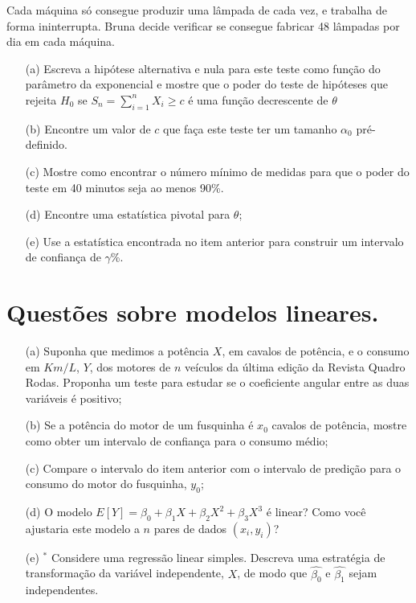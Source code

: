 \documentclass[a4paper,12pt, notitlepage]{report}
\begin{document}
Cada máquina só consegue produzir uma lâmpada de cada vez, e trabalha de forma ininterrupta.
Bruna decide verificar se consegue fabricar 48 lâmpadas por dia em cada máquina.

\begin{itemize}
 \item[(a)] Escreva a hipótese alternativa e nula para este teste como função do parâmetro da exponencial e mostre que o poder do teste de hipóteses que rejeita $H_0$ se $S_n = \sum_{i=1}^nX_i \ge c$ é uma função decrescente de $\theta$
 \item[(b)] Encontre um valor de $c$ que faça este teste ter um tamanho $\alpha_0$ pré-definido.
 \item[(c)] Mostre como encontrar o número mínimo de medidas para que o poder do teste em 40 minutos seja ao menos 90\%.
 \item[(d)] Encontre uma estatística pivotal para $\theta$;
 \item[(e)] Use a estatística encontrada no item anterior para construir um intervalo de confiança  de $\gamma$\%.
\end{itemize}


\section{Questões sobre modelos lineares.}
\begin{itemize}
 \item[(a)] Suponha que medimos a potência $X$, em cavalos de potência,  e o consumo em $Km/L$, $Y$, dos motores de $n$ veículos da última edição da Revista Quadro Rodas.
 Proponha um teste para estudar se o coeficiente angular entre as duas variáveis é positivo;
 \item[(b)] Se a potência do motor de um fusquinha é $x_0$ cavalos de potência, mostre como obter um intervalo de confiança para o consumo médio;
 \item[(c)] Compare o intervalo do item anterior com o intervalo de predição para o consumo do motor do fusquinha, $y_0$;
 \item[(d)] O modelo $E[Y] = \beta_0 + \beta_1X + \beta_2X^2 + \beta_3X^3$ é linear?
 Como você ajustaria este modelo a $n$ pares de dados $(x_i, y_i)$?
 \item[(e)]$^\ast$ Considere uma regressão linear simples.
 Descreva uma estratégia de transformação da variável independente, $X$, de modo que $\hat{\beta_0}$ e $\hat{\beta_1}$ sejam independentes. 
\end{itemize}
\end{document}
